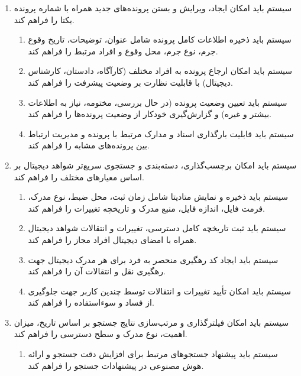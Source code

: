 \documentclass[12pt,a4paper,oneside]{article}
\begin{document}
\begin{itemize}
\begin{enumerate}
            \item 
            سیستم باید امکان ایجاد، ویرایش و بستن پرونده‌های جدید همراه با شماره پرونده یکتا را فراهم کند.
            \begin{enumerate}
                \renewcommand{\labelenumii}{{\rl{\arabic{enumii}.\arabic{enumi}}}R-}
                \item 
                سیستم باید ذخیره اطلاعات کامل پرونده شامل عنوان، توضیحات، تاریخ وقوع جرم، نوع جرم، محل وقوع و افراد مرتبط را فراهم کند.
                \item 
                سیستم باید امکان ارجاع پرونده به افراد مختلف (کارآگاه، دادستان، کارشناس دیجیتال) با قابلیت نظارت بر وضعیت پیشرفت را فراهم کند.
                \item 
                سیستم باید تعیین وضعیت پرونده (در حال بررسی، مختومه، نیاز به اطلاعات بیشتر و غیره) و گزارش‌گیری خودکار از وضعیت پرونده‌ها را فراهم کند.
                \item 
                سیستم باید قابلیت بارگذاری اسناد و مدارک مرتبط با پرونده و مدیریت ارتباط بین پرونده‌های مشابه را فراهم کند.
            \end{enumerate}
    
            \item 
            سیستم باید امکان برچسب‌گذاری، دسته‌بندی و جستجوی سریع‌تر شواهد دیجیتال بر اساس معیارهای مختلف را فراهم کند.
            \begin{enumerate}
                \renewcommand{\labelenumii}{{\rl{\arabic{enumii}.\arabic{enumi}}}R-}
                \item 
                سیستم باید ذخیره و نمایش متادیتا شامل زمان ثبت، محل ضبط، نوع مدرک، فرمت فایل، اندازه فایل، منبع مدرک و تاریخچه تغییرات را فراهم کند.
                \item 
                سیستم باید ثبت تاریخچه کامل دسترسی، تغییرات و انتقالات شواهد دیجیتال همراه با امضای دیجیتال افراد مجاز را فراهم کند.
                \item 
                سیستم باید ایجاد کد رهگیری منحصر به فرد برای هر مدرک دیجیتال جهت رهگیری نقل و انتقالات آن را فراهم کند.
                \item 
                سیستم باید امکان تأیید تغییرات و انتقالات توسط چندین کاربر جهت جلوگیری از فساد و سوءاستفاده را فراهم کند.
            \end{enumerate}
    
            \item 
            سیستم باید امکان فیلترگذاری و مرتب‌سازی نتایج جستجو بر اساس تاریخ، میزان اهمیت، نوع مدرک و سطح دسترسی را فراهم کند.
            \begin{enumerate}
                \renewcommand{\labelenumii}{{\rl{\arabic{enumii}.\arabic{enumi}}}R-}
                \item 
                سیستم باید پیشنهاد جستجوهای مرتبط برای افزایش دقت جستجو و ارائه هوش مصنوعی در پیشنهادات جستجو را فراهم کند.
            \end{enumerate}
    

\end{enumerate}
\end{itemize}
\end{document}
